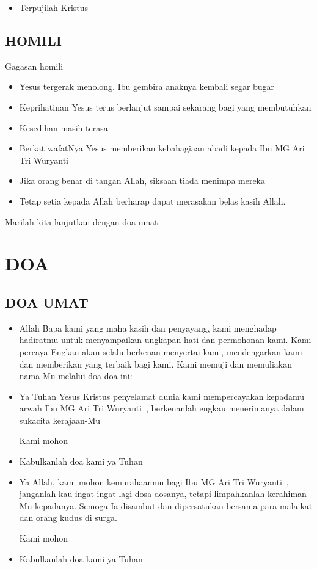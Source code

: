 \documentclass[a5paper,headsepline,titlepage,11pt,nnormalheadings,DIVcalc]{scrbook}
\newcommand{\BU}[1]{\begin{itemize} \item[U:] #1 \end{itemize}}
\newcommand{\BP}[1]{\begin{itemize} \item[P:] #1 \end{itemize}}
\newcommand{\namaalm}{Ibu MG Ari Tri Wuryanti~}
\begin{document}
\BU{Terpujilah Kristus}

\subsection*{HOMILI}

Gagasan homili
\begin{itemize}
\item Yesus tergerak menolong. Ibu gembira anaknya kembali segar bugar
\item Keprihatinan Yesus terus berlanjut sampai sekarang bagi yang membutuhkan
\item Kesedihan masih terasa
\item Berkat wafatNya Yesus memberikan kebahagiaan abadi kepada \namaalm
\item Jika orang benar di tangan Allah, siksaan tiada menimpa mereka
\item Tetap setia kepada Allah berharap dapat merasakan belas kasih Allah.
\end{itemize}

Marilah kita lanjutkan dengan doa umat

\section*{DOA}

\subsection*{DOA UMAT}

\BP{Allah Bapa kami yang maha kasih dan penyayang, kami menghadap hadiratmu untuk menyampaikan ungkapan hati dan permohonan kami. Kami percaya Engkau akan selalu berkenan menyertai kami, mendengarkan kami dan memberikan yang terbaik bagi kami. Kami memuji dan memuliakan nama-Mu melalui doa-doa ini:}

\BP{Ya Tuhan Yesus Kristus penyelamat dunia kami mempercayakan kepadamu arwah \namaalm, berkenanlah engkau menerimanya dalam sukacita kerajaan-Mu

Kami mohon}

\BU{Kabulkanlah doa kami ya Tuhan}

\BP{Ya Allah, kami mohon kemurahaanmu bagi \namaalm , janganlah kau ingat-ingat lagi dosa-dosanya, tetapi limpahkanlah kerahiman-Mu kepadanya. Semoga Ia disambut dan dipersatukan bersama para malaikat dan orang kudus di surga.

Kami mohon}

\BU{Kabulkanlah doa kami ya Tuhan}
\end{document}

